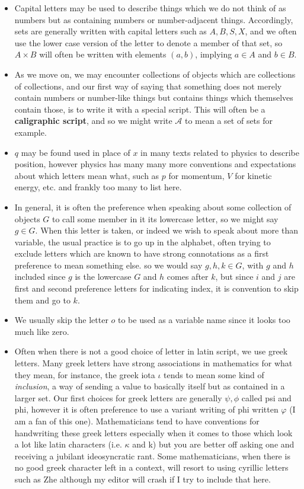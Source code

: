 \documentclass[11pt]{article}
\begin{document}
\begin{itemize}
\item Capital letters may be used to describe things which we do not think of as numbers but as containing numbers or number-adjacent things. Accordingly, sets are generally written with capital letters such as $A,B,S,X$, and we often use the lower case version of the letter to denote a member of that set, so $A \times B$ will often be written with elements $(a,b)$, implying $a\in A$ and $b\in B$.
\item As we move on, we may encounter collections of objects which are collections of collections, and our first way of saying that something does not merely contain numbers or number-like things but contains things which themselves contain those, is to write it with a special script. This will often be a \textbf{caligraphic script}, and so we might write $\mathcal{A}$ to mean a set of sets for example.
\item $q$ may be found used in place of $x$ in many texts related to physics to describe position, however physics has many many more conventions and expectations about which letters mean what, such as $p$ for momentum, $V$ for kinetic energy, etc. and frankly too many to list here.
\item In general, it is often the preference when speaking about some collection of objects $G$ to call some member in it its lowercase letter, so we might say $g \in G$. When this letter is taken, or indeed we wish to speak about more than variable, the usual practice is to go up in the alphabet, often trying to exclude letters which are known to have strong connotations as a first preference to mean something else. so we would say $g,h,k \in G$, with $g$ and $h$ included since $g$ is the lowercase $G$ and $h$ comes after $k$, but since $i$ and $j$ are first and second preference letters for indicating index, it is convention to skip them and go to $k$.
\item We usually skip the letter $o$ to be used as a variable name since it looks too much like zero.
\item Often when there is not a good choice of letter in latin script, we use greek letters. Many greek letters have strong associations in mathematics for what they mean, for instance, the greek iota $\iota$ tends to mean some kind of \emph{inclusion}, a way of sending a value to basically itself but as contained in a larger set. Our first choices for greek letters are generally $\psi,\phi$ called psi and phi, however it is often preference to use a variant writing of phi written $\varphi$ (I am a fan of this one). Mathematicians tend to have conventions for handwriting these greek letters especially when it comes to those which look a lot like latin characters (i.e. $\kappa$ and k) but you are better off asking one and receiving a jubilant ideosyncratic rant. Some mathematicians, when there is no good greek character left in a context, will resort to using cyrillic letters such as Zhe although my editor will crash if I try to include that here.


\end{itemize}
\end{document}
